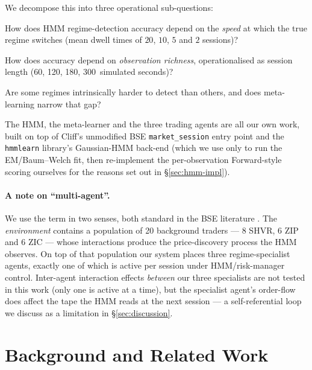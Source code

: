 \documentclass[11pt,a4paper]{article}
\begin{document}
We decompose this into three operational sub-questions:
\begin{description}[leftmargin=1.4cm,style=nextline]
    \item[RQ1.] How does HMM regime-detection accuracy depend on the
    \emph{speed} at which the true regime switches (mean dwell times of $20$,
    $10$, $5$ and $2$ sessions)?
    \item[RQ2.] How does accuracy depend on \emph{observation richness},
    operationalised as session length (60, 120, 180, 300~simulated seconds)?
    \item[RQ3.] Are some regimes intrinsically harder to detect than others,
    and does meta-learning narrow that gap?
\end{description}

The HMM, the meta-learner and the three trading agents are all our own work,
built on top of Cliff's unmodified BSE \texttt{market\_session} entry point
\cite{cliff2018bse} and the \texttt{hmmlearn} library's Gaussian-HMM
back-end \cite{hmmlearn} (which we use only to run the EM/Baum--Welch
fit, then re-implement the per-observation Forward-style scoring ourselves
for the reasons set out in \S\ref{sec:hmm-impl}).

\paragraph{A note on ``multi-agent''.}
We use the term in two senses, both standard in the BSE literature
\cite{cliff2018bse}. The \emph{environment} contains a population of 20
background traders --- 8 SHVR, 6 ZIP and 6 ZIC --- whose interactions
produce the price-discovery process the HMM observes. On top of that
population our system places three regime-specialist agents, exactly one of
which is active per session under HMM/risk-manager control. Inter-agent
interaction effects \emph{between} our three specialists are not tested in
this work (only one is active at a time), but the specialist agent's
order-flow does affect the tape the HMM reads at the next session --- a
self-referential loop we discuss as a limitation in \S\ref{sec:discussion}.


\section{Background and Related Work}\label{sec:background}
\end{document}
